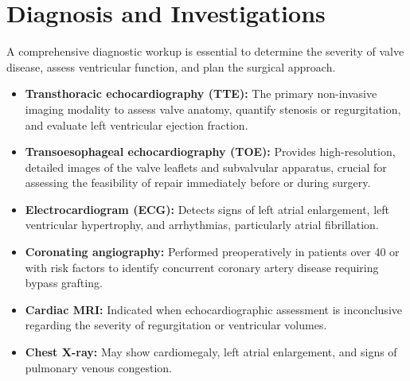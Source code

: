 \section*{Diagnosis and Investigations}
A comprehensive diagnostic workup is essential to determine the severity of valve disease, assess ventricular function, and plan the surgical approach.
\begin{itemize}
    \item \textbf{Transthoracic echocardiography (TTE):} The primary non-invasive imaging modality to assess valve anatomy, quantify stenosis or regurgitation, and evaluate left ventricular ejection fraction.
    \item \textbf{Transoesophageal echocardiography (TOE):} Provides high-resolution, detailed images of the valve leaflets and subvalvular apparatus, crucial for assessing the feasibility of repair immediately before or during surgery.
    \item \textbf{Electrocardiogram (ECG):} Detects signs of left atrial enlargement, left ventricular hypertrophy, and arrhythmias, particularly atrial fibrillation.
    \item \textbf{Coronating angiography:} Performed preoperatively in patients over 40 or with risk factors to identify concurrent coronary artery disease requiring bypass grafting.
    \item \textbf{Cardiac MRI:} Indicated when echocardiographic assessment is inconclusive regarding the severity of regurgitation or ventricular volumes.
    \item \textbf{Chest X-ray:} May show cardiomegaly, left atrial enlargement, and signs of pulmonary venous congestion.
\end{itemize}


